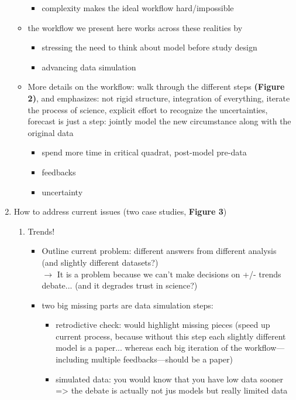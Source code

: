 \documentclass[11pt]{article}
\begin{document}
\begin{enumerate}
\begin{itemize}
\begin{itemize}
\item complexity makes the ideal workflow hard/impossible
\end{itemize}
\item the workflow we present here works across these realities by
\begin{itemize}
\item stressing the need to think about model before study design
\item advancing data simulation
\end{itemize}
\item More details on the workflow:  walk through the different steps \textbf{(Figure 2)}, and emphasizes: not rigid structure, integration of everything,  iterate the process of science, explicit effort to recognize the uncertainties, \\
forecast is just a step:  jointly model the new circumstance along with the original data
\begin{itemize}
\item spend more time in critical quadrat, post-model pre-data
\item feedbacks
\item uncertainty
\end{itemize}
\end{itemize}
\item How to address current issues (two case studies, \textbf{Figure 3})
\begin{enumerate}
\item Trends!
\begin{itemize}
\item Outline current problem: different answers from different analysis (and slightly different datasets?)\\
$\rightarrow$ It is a problem because we can't make decisions on +/- trends debate... (and it degrades trust in science?)
\item two big missing parts are data simulation steps:
\begin{itemize}
\item retrodictive check: would highlight missing pieces (speed up current process, because without this step each slightly different model is a paper... whereas each big iteration of the workflow---including multiple feedbacks---should be a paper)
\item simulated data: you would know that you have low data sooner => the debate is actually not jus models but really limited data

\end{itemize}
\end{itemize}
\end{enumerate}
\end{enumerate}
\end{document}
